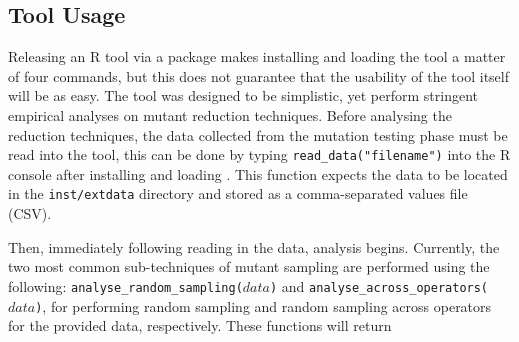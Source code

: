\subsection{Tool Usage}

Releasing an R tool via a package makes installing and loading the tool
a matter of four commands, but this does not guarantee that the usability
of the tool itself will be as easy. The \mr tool was designed to be simplistic,
yet perform stringent empirical analyses on mutant reduction techniques. Before
analysing the reduction techniques, the data collected from the mutation testing
phase must be read into the \mr tool, this can be done by typing \small{\texttt{read\_data("filename")}}
into the R console after installing and loading \mr. This function expects the data
to be located in the \texttt{inst/extdata} directory and stored as a comma-separated values
file (CSV).

Then, immediately following reading in the data, analysis begins. Currently, the two most common
sub-techniques of mutant sampling are performed using the following:
\texttt{analyse\_random\_sampling($data$)} and \texttt{analyse\_across\_operators($data$)},
for performing random sampling and random sampling across operators for the provided data, respectively.
These functions will return
